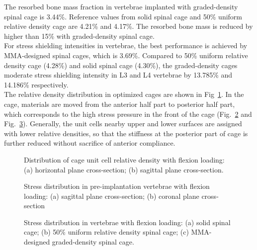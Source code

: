 \documentclass[12pt]{extbook}
\begin{document}
The resorbed bone mass fraction in vertebrae implanted with graded-density spinal cage is 3.44\%. Reference values from solid spinal cage and 50\% uniform relative density cage are 4.21\% and 4.17\%.
The resorbed bone mass is reduced by higher than 15\% with graded-density spinal cage.\\


For stress shielding intensities in vertebrae, the best performance is achieved by MMA-designed spinal cages, which is 3.69\%. Compared to 50\% uniform relative density cage (4.28\%) and solid spinal cage (4.30\%), the graded-density cages moderate stress shielding intensity in L3 and L4 vertebrae by 13.785\% and 14.186\% respectively.\\

The relative density distribution in optimized cages are shown in Fig~\ref{density_flexion}. In the cage, materials are moved from the anterior half part to posterior half part, which corresponds to the high stress pressure in the front of the cage (Fig.~\ref{ref_flexion} and Fig.~\ref{stress_flexion}). Generally, the unit cells nearby upper and lower surfaces are assigned with lower relative densities, so that the stiffness at the posterior part of cage is further reduced without sacrifice of anterior compliance.\\

\begin{figure}[htbp]
\centering
{}
\caption{Distribution of cage unit cell relative density with flexion loading: (a) horizontal plane cross-section; (b) sagittal plane cross-section.}
\label{density_flexion}
\end{figure}

\begin{figure}[htbp]
\centering
{}
\caption{Stress distribution in pre-implantation vertebrae with flexion loading: (a) sagittal plane cross-section; (b) coronal plane cross-section}
\label{ref_flexion}
\end{figure}

\begin{figure}[htbp]
\centering
{}
\caption{Stress distribution in vertebrae with flexion loading: (a) solid spinal cage; (b) 50\% uniform relative density spinal cage; (c) MMA-designed graded-density spinal cage.}
\label{stress_flexion}
\end{figure}
\end{document}
